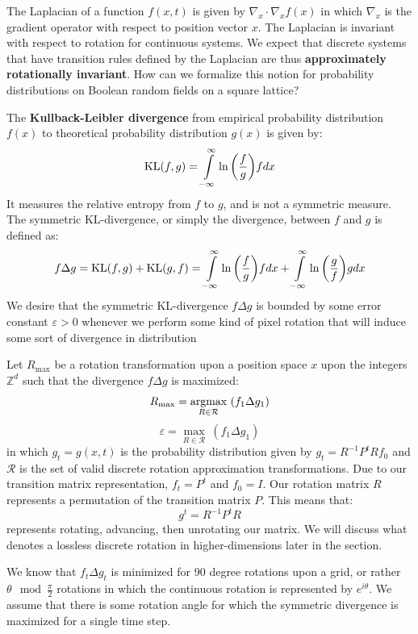 \documentclass[10pt, a5paper, twoside, openright]{memoir}
\begin{document}
The Laplacian of a function $f(x, t)$ is given by $\nabla_x \cdot \nabla_x f(x) $ in which $\nabla_x$ is the gradient operator with respect to position vector $x$. The Laplacian is invariant with respect to rotation for continuous systems. We expect that discrete systems that have transition rules defined by the Laplacian are thus \textbf{approximately rotationally invariant}. How can we formalize this notion for probability distributions on Boolean random fields on a square lattice?

The \textbf{Kullback-Leibler divergence} from empirical probability distribution $f(x)$ to theoretical probability distribution $g(x)$ is given by:
$$\textnormal{KL}(f, g) = \int\limits_{-\infty}^\infty \ln \bigg (\frac{f}{g} \bigg )f dx$$
It measures the relative entropy from $f$ to $g$, and is not a symmetric measure. The symmetric KL-divergence, or simply the divergence, between $f$ and $g$ is defined as:
$$f \Delta g = \textnormal{KL}(f, g) + \textnormal{KL}(g, f) = 
\int\limits_{-\infty}^\infty \ln \bigg (\frac{f}{g} \bigg )f dx + \int\limits_{-\infty}^\infty \ln \bigg (\frac{g}{f} \bigg)g dx$$
We desire that the symmetric KL-divergence $f \Delta g$ is bounded by some error constant $\varepsilon > 0$ whenever we perform some kind of pixel rotation that will induce some sort of divergence in distribution

Let $R_{\max}$ be a rotation transformation upon a position space $x$ upon the integers $\mathbb Z^d$ such that the divergence $f \Delta g$ is maximized:
$$R_{\max} = \underset{R \in \mathcal R}{\textnormal{argmax}} \ (f_1 \Delta g_1)$$
$$\varepsilon = \underset{R \in \mathcal R}{\max} \ (f_1 \Delta g_1)$$
in which $g_t = g(x, t)$ is the probability distribution given by $g_t = R^{-1}P^t R f_0$ and $\mathcal R$ is the set of valid discrete rotation approximation transformations. Due to our transition matrix representation, $f_t = P^t$ and $f_0 = I$. Our rotation matrix $R$ represents a permutation of the transition matrix $P$. This means that:
$$g^t = R^{-1} P^t R$$
represents rotating, advancing, then unrotating our matrix. We will discuss what denotes a lossless discrete rotation in higher-dimensions later in the section. 

We know that $f_t \Delta g_t$ is minimized for 90 degree rotations upon a grid, or rather $\theta \mod \frac{\pi}{2}$ rotations in which the continuous rotation is represented by $e^{i \theta}$. We assume that there is some rotation angle for which the symmetric divergence is maximized for a single time step.
\end{document}
